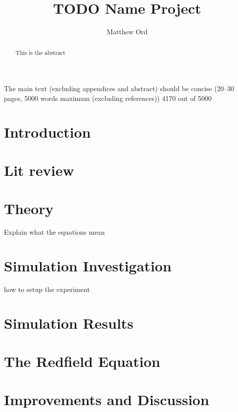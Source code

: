 \documentclass{article}
\title{TODO Name Project}
\author{Matthew Ord}
\date{}
\begin{document}
\maketitle
The main text (excluding appendices and abstract) should be concise (20–30 pages, 5000 words maximum (excluding references))
4170 out of 5000
\begin{abstract}
    This is the abstract
\end{abstract}



\pagebreak
\section{Introduction}



\section{Lit review}

\section{Theory}\label{sec:the model}
Explain what the equations mean


\section{Simulation Investigation}\label{sec:simulation}
how to setup the experiment


\section{Simulation Results}\label{sec:simulation results}




\section{The Redfield Equation}\label{sec:redfield}


\section{Improvements and Discussion}\label{sec:improvements}

\end{document}
